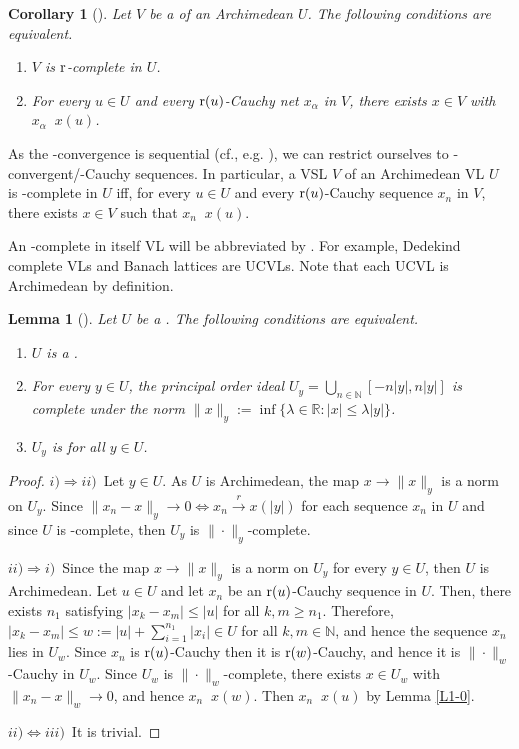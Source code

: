 \documentclass[12pt]{article}
\newtheorem{lem}{Lemma}
\newtheorem{cor}{Corollary}
\DeclareMathOperator{\ruc}{\xrightarrow[]{r}}
\renewcommand{\le}{\leqslant}
\renewcommand{\ge}{\geqslant}
\begin{document}
\begin{cor}[]\label{same reg}
Let $V$ be a  of an Archimedean  $U$.
The following conditions are equivalent.
\begin{enumerate}[$i)$]
\item
$V$ is $\text{\rm r}$-complete in $U$.
\item
For every $u\in U$ and every $\text{\rm r}(u)$-Cauchy net $x_\alpha$ in $V$,
there exists $x\in V$ with $x_\alpha\ruc x(u)$.
\end{enumerate}
\end{cor}


\smallskip
As the -convergence is sequential
(cf., e.g. \cite[Proposition 2.4]{AEG}), 
we can restrict ourselves to -convergent/-Cauchy sequences. 
In particular, a VSL $V$ of an Archimedean VL $U$ is -complete in $U$
iff, for every $u\in U$ and every $\text{\rm r}(u)$-Cauchy sequence $x_n$ in $V$,
there exists $x\in V$ such that $x_n\ruc x(u)$. 

\smallskip
An -complete in itself VL will be abbreviated by .
For example, Dedekind complete VLs and Banach lattices are UCVLs.
Note that each UCVL is Archimedean by definition.

\begin{lem}[]\label{princ-ideal}
Let $U$ be a . The following conditions are equivalent.
\begin{enumerate}[$i)$]
\item
$U$ is a .
\item
For every $y\in U$, the principal order ideal $U_y=\bigcup_{n\in\mathbb{N}}[-n|y|,n|y|]$ 
is complete under the norm $\|x\|_y:=\inf\{\lambda\in\mathbb{R}:|x|\le\lambda|y|\}$.
\item
$U_y$ is  for all $y\in U$.
\end{enumerate}
\end{lem}

\begin{proof}
$i)\Longrightarrow ii)$\
Let $y\in U$. As $U$ is Archimedean, the map $x\to\|x\|_y$ is a norm on $U_y$.
Since $\|x_n-x\|_y\to 0\Longleftrightarrow x_n\xrightarrow[]{r}x(|y|)$ 
for each sequence $x_n$ in $U$ and since $U$ is \text{\rm r}-complete, then $U_y$ 
is $\|\cdot\|_y$-complete.

\smallskip
$ii)\Longrightarrow i)$\
Since the map $x\to\|x\|_y$ is a norm on $U_y$ for every $y\in U$, then $U$ is Archimedean.
Let $u\in U$ and let $x_n$ be an $\text{\rm r}(u)$-Cauchy sequence in $U$.
Then, there exists $n_1$ satisfying $|x_k-x_m|\le|u|$ for all $k,m\ge n_1$.
Therefore, $|x_k-x_m|\le w:=|u|+\sum_{i=1}^{n_1}|x_i|\in U$ for all $k,m\in\mathbb{N}$,
and hence the sequence $x_n$ lies in $U_w$. Since $x_n$ is  $\text{\rm r}(u)$-Cauchy 
then it is  $\text{\rm r}(w)$-Cauchy,
and hence it is $\|\cdot\|_w$-Cauchy in $U_w$. Since $U_w$ is $\|\cdot\|_w$-complete,
there exists $x\in U_w$ with $\|x_n-x\|_w\to 0$, and hence $x_n\ruc x(w)$.
Then $x_n\ruc x(u)$ by Lemma \ref{L1-0}. 

\smallskip
$ii)\Longleftrightarrow iii)$\
It is trivial.
\end{proof}
\end{document}
